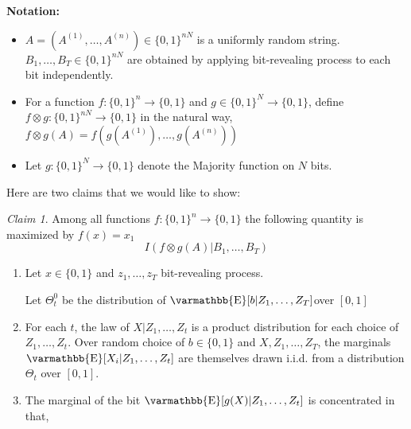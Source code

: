 \documentclass
[12pt,letterpaper]
{article}
\theoremstyle{definition}
\theoremstyle{remark}
\newtheorem{claim}[theorem]{Claim}
\let\mathbb\varmathbb
\newcommand{\Esymb}{\mathbb{E}}
\DeclareMathOperator*{\E}{\Esymb}
\numberwithin{equation}{section}
\begin{document}
\textbf{Notation:}

\begin{itemize}
	\item $A = (A^{(1)},\ldots,A^{(n)}) \in \{0,1\}^{nN}$ is a uniformly random string.  $B_1,\ldots,B_T \in \{0,1\}^{nN}$ are obtained by applying bit-revealing process to each bit independently.

	\item For a function $f: \{0,1\}^n \to \{0,1\}$ and $g \in \{0,1\}^N \to \{0,1\}$, define $f \otimes g: \{0,1\}^{nN} \to \{0,1\}$ in the natural way, $f\otimes g(A) = f( g(A^{(1)}),\ldots,g(A^{(n)}))$

	\item Let $g:\{0,1\}^N \to \{0,1\}$ denote the Majority function on $N$ bits.
\end{itemize}

Here are two claims that we would like to show:
\begin{claim}
	Among all functions $f: \{0,1\}^n \to \{0,1\}$ the following quantity is maximized by $f(x) = x_1$
	\[ I(f \otimes g(A)| B_1,\ldots,B_T)\]
\end{claim}



\begin{enumerate}
	\item Let $x \in \{0,1\}$ and $z_1,\ldots,z_T$  bit-revealing process.  

	Let $\Theta^0_t$ be the distribution of $\E[b|Z_1,\ldots,Z_T] $over $[0,1]$
	\item For each $t$, the law of $X|Z_1,\ldots,Z_t$ is a product distribution for each choice of $Z_1,\ldots, Z_t$.  Over random choice of $b \in \{0,1\}$ and $X, Z_1,\ldots, Z_T$, the marginals $\E[X_i | Z_1,\ldots, Z_t]$ are themselves drawn i.i.d. from a distribution $\Theta_t$ over $[0,1]$.
	\item The marginal of the bit $\E[g(X)|Z_1,\ldots,Z_t]$ is concentrated in that,
\end{enumerate}

\fi

\appendix



  
\end{document}
